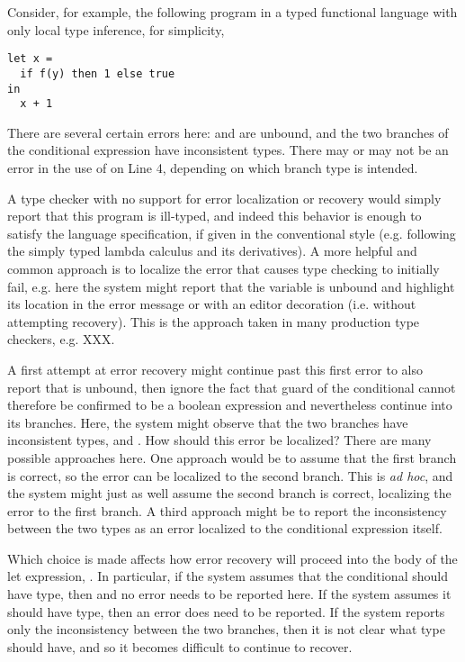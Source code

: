 Consider, for example, the following program in a typed functional language with only local type inference, for simplicity, 
\begin{lstlisting}[numbers=none]
let x = 
  if f(y) then 1 else true
in 
  x + 1
\end{lstlisting}
There are several certain errors here:  and  are unbound, and the two branches of the conditional expression have inconsistent types. There may or may not be an error in the use of  on Line 4, depending on which branch type is intended.

A type checker with no support for error localization or recovery would simply report that this program is ill-typed, and indeed this behavior is enough to satisfy the language specification, if given in the conventional style (e.g. following the simply typed lambda calculus and its derivatives). A more helpful and common approach is to localize the error that causes type checking to initially fail, e.g. here the system might report that the variable  is unbound and highlight its location in the error message or with an editor decoration (i.e. without attempting recovery).
This is the approach taken in many production type checkers, e.g. XXX.

A first attempt at error recovery might continue past this first error to also report that  is unbound, then ignore the fact that guard of the conditional cannot therefore be confirmed to be a boolean expression and nevertheless continue into its branches. Here, the system might observe that the two branches have inconsistent types,  and . How should this error be localized? There are many possible approaches here.
One approach would be to assume that the first branch is correct, so the error can be localized to the second branch. This is \emph{ad hoc}, and the system might just as well assume the second branch is correct, localizing the error to the first branch.
A third approach might be to report the inconsistency between the two types as an error localized to the conditional expression itself. 

Which choice is made affects how error recovery will proceed into the body of the let expression, . In particular, if the system assumes that the conditional should have  type, then  and no error needs to be reported here. 
If the system assumes it should have  type, then an error does need to be reported. 
If the system reports only the inconsistency between the two branches, then it is not clear what type  should have, and so it becomes difficult to continue to recover.


